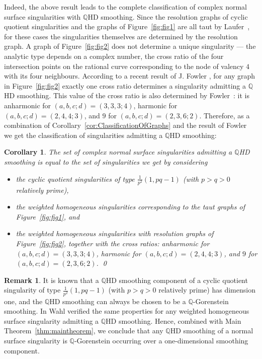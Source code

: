 \documentclass[a4paper, reqno, twoside]{amsart}
\newtheorem{corollary}[theorem]{Corollary}
\theoremstyle{definition}
\newtheorem{remark}[theorem]{Remark}
\numberwithin{equation}{section}
\begin{document}
Indeed, the above result leads to the complete classification of
complex normal surface singularities with {$\mathbb{Q}$HD smoothing\xspace}.  Since the resolution
graphs of cyclic quotient singularities and the graphs of
Figure~\ref{fig:fig1} are all taut by Laufer~\cite{Laufer-1973-Taut},
for these cases the singularities themselves are determined by the
resolution graph. A graph of Figure~\ref{fig:fig2} does not determine
a unique singularity --- the analytic type depends on a complex
number, the cross ratio of the four intersection points on the
rational curve corresponding to the node of valency $4$ with its four
neighbours. According to a recent result of J. Fowler
\cite[Theorem 5(a)]{Fowler-2013}, for any graph in Figure~\ref{fig:fig2} exactly one
cross ratio determines a singularity admitting a {$\mathbb{Q}$HD\xspace} smoothing. This
value of the cross ratio is also determined by
Fowler~\cite{Fowler-2013}: it is anharmonic for $(a,b,c;d)=(3,3,3;4)$,
harmonic for $(a,b,c;d)=(2,4,4;3)$, and $9$ for
$(a,b,c;d)=(2,3,6;2)$. Therefore, as a combination of
Corollary~\ref{cor:ClassificationOfGraphs} and the result of
Fowler~\cite{Fowler-2013} we get the classification of singularities
admitting a {$\mathbb{Q}$HD smoothing\xspace}:
\begin{corollary}
  The set of complex normal surface singularities admitting a {$\mathbb{Q}$HD smoothing\xspace}
  is equal to the set of singularities we get by considering

\begin{itemize}
\item the cyclic quotient singularities of type
$\frac{1}{p^2}(1,pq-1)$ (with $p>q>0$ relatively prime),

\item the weighted homogeneous singularities corresponding to the taut graphs of
  Figure~\ref{fig:fig1}, and

\item the weighted homogeneous singularities with resolution graphs of Figure~\ref{fig:fig2},
  together with the cross ratios: anharmonic for $(a,b,c;d)=(3,3,3;4)$,
  harmonic for $(a,b,c;d)=(2,4,4;3)$, and $9$ for $(a,b,c;d)=(2,3,6;2)$. \qed
\end{itemize}
\end{corollary}

\begin{remark}
It is known that a {$\mathbb{Q}$HD smoothing\xspace} component of a cyclic quotient singularity of
type $\frac{1}{p^2}(1,pq-1)$ (with $p>q>0$ relatively prime) has
dimension one, and the {$\mathbb{Q}$HD smoothing\xspace} can always be chosen to be a
$\mathbb{Q}$-Gorenstein smoothing. In \cite{Wahl-2011, Wahl-2011-log}
Wahl verified the same properties for any weighted homogeneous surface
singularity admitting a {$\mathbb{Q}$HD smoothing\xspace}. Hence, combined with Main
Theorem~\ref{thm:maintheorem}, we conclude that any {$\mathbb{Q}$HD smoothing\xspace} of a
normal surface singularity is $\mathbb{Q}$-Gorenstein occurring over a
one-dimensional smoothing component.
\end{remark}
\end{document}
